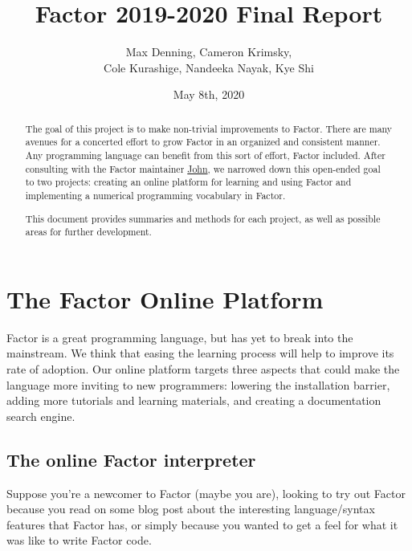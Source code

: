 \documentclass[
]{article}
\title{Factor 2019-2020 Final Report}
\author{Max Denning, Cameron Krimsky, \\ Cole Kurashige, Nandeeka Nayak, Kye Shi}
\date{May 8th, 2020}
\begin{document}
\maketitle


\begin{abstract}
The goal of this project is to make non-trivial improvements to Factor.
There are many avenues for a concerted effort to grow Factor in an
organized and consistent manner. Any programming language can benefit
from this sort of effort, Factor included. After consulting with the
Factor maintainer \href{https://re-factor.blogspot.com/}{John}, we
narrowed down this open-ended goal to two projects: creating an online
platform for learning and using Factor and implementing a numerical
programming vocabulary in Factor.

This document provides summaries and methods for each project, as well as
possible areas for further development.
\end{abstract}

\hypertarget{the-factor-online-platform}{%
\section{The Factor Online Platform}\label{the-factor-online-platform}}

Factor is a great programming language, but has yet to break into the
mainstream. We think that easing the learning process will help to
improve its rate of adoption. Our online platform targets three aspects
that could make the language more inviting to new programmers: lowering
the installation barrier, adding more tutorials and learning materials,
and creating a documentation search engine.

\hypertarget{the-online-factor-interpreter}{%
\subsection{The online Factor
interpreter}\label{the-online-factor-interpreter}}

Suppose you're a newcomer to Factor (maybe you are), looking to try out
Factor because you read on some blog post about the interesting
language/syntax features that Factor has, or simply because you wanted
to get a feel for what it was like to write Factor code.
\end{document}

